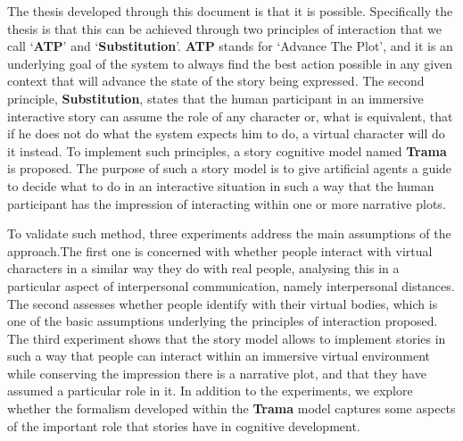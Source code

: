 \documentclass[
		twoside,openright,titlepage,numbers=noenddot,manychapters,
		headinclude,%
                footinclude=false,cleardoublepage=empty,
                BCOR=5mm,
		fontsize=11pt, %
                 enabledeprecatedfontcommands]{scrreprt}
\begin{document}
The thesis developed through this document is that it is possible. Specifically the thesis is that this can be achieved through two principles of interaction that we call `\textbf{ATP}' and `\textbf{Substitution}'. \textbf{ATP} stands for `Advance The Plot', and it is an underlying goal of the system to always find the best action possible in any given context that will advance the state of the story being expressed. The second principle, \textbf{Substitution}, states that the human participant in an immersive interactive story can assume the role of any character or, what is equivalent, that if he does not do what the system expects him to do, a virtual character will do it instead. To implement such principles, a story cognitive model named \textbf{Trama} is proposed. The purpose of such a story model is to give artificial agents a guide to decide what to do in an interactive situation in such a way that the human participant has the impression of interacting within one or more narrative plots. 

To validate such method, three experiments address the main assumptions of the approach.The first one is concerned with  whether people interact with virtual characters in a similar way they do with real people, analysing this in a particular aspect of interpersonal communication, namely interpersonal distances. The second assesses whether people identify with their virtual bodies, which is one of the basic assumptions underlying the principles of interaction proposed.  
The third experiment shows that the story model allows to implement stories in such a way that  people can interact within an immersive virtual environment while conserving the impression there is a narrative plot, and that they have assumed a particular role in it. 
In addition to the experiments, we explore whether the formalism developed within the \textbf{Trama} model captures some aspects of the important role that stories have in cognitive development. 

\cleardoublepage


\end{document}
